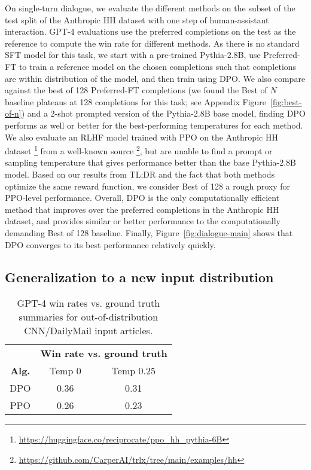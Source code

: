 \documentclass{article}
\begin{document}
On single-turn dialogue, we evaluate the different methods on the subset of the test split of the Anthropic HH dataset \citep{bai2022training} with one step of human-assistant interaction. GPT-4 evaluations use the preferred completions on the test as the reference to compute the win rate for different methods. As there is no standard SFT model for this task, we start with a pre-trained Pythia-2.8B, use Preferred-FT to train a reference model on the chosen completions such that completions are within distribution of the model, and then train using DPO. We also compare against the best of 128 Preferred-FT completions (we found the Best of $N$ baseline plateaus at 128 completions for this task; see Appendix Figure~\ref{fig:best-of-n}) and a 2-shot prompted version of the Pythia-2.8B base model, finding DPO performs as well or better for the best-performing temperatures for each method. We also evaluate an RLHF model trained with PPO on the Anthropic HH dataset \footnote{\url{https://huggingface.co/reciprocate/ppo_hh_pythia-6B}} from a well-known source \footnote{\url{https://github.com/CarperAI/trlx/tree/main/examples/hh}}, but are unable to find a prompt or sampling temperature that gives performance better than the base Pythia-2.8B model. Based on our results from TL;DR and the fact that both methods optimize the same reward function, we consider Best of 128 a rough proxy for PPO-level performance. Overall, DPO is the only computationally efficient method that improves over the preferred completions in the Anthropic HH dataset, and provides similar or better performance to the computationally demanding Best of 128 baseline. Finally, Figure~\ref{fig:dialogue-main} shows that DPO converges to its best performance relatively quickly.

\subsection{Generalization to a new input distribution}

\begin{wraptable}{r}{0.375\textwidth}
    \small
    \vspace{-10mm}
    \begin{tabular}{ccc}
        \toprule
        & \multicolumn{2}{c}{\textbf{Win rate vs. ground truth}} \\
        \cmidrule(lr){2-3}
        \textbf{Alg.} & Temp $0$ & Temp $0.25$ \\
        \midrule
        DPO & 0.36 & 0.31 \\
        PPO & 0.26 & 0.23 \\
        \bottomrule
    \end{tabular}
    \caption{GPT-4 win rates vs. ground truth summaries for out-of-distribution CNN/DailyMail input articles.}
    \vspace{-3mm}
    \label{tab:ood}
\end{wraptable}
\end{document}
